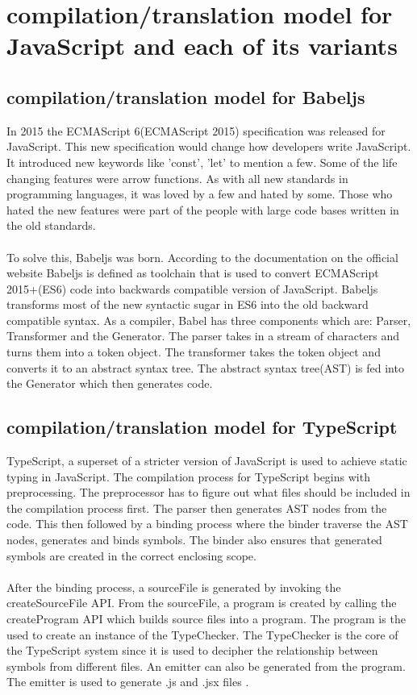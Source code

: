\section{compilation/translation model for JavaScript and each of its variants}

\subsection{compilation/translation model for Babeljs}
In 2015 the ECMAScript 6(ECMAScript 2015) specification was released for JavaScript. This new specification would change how developers write JavaScript. It introduced new keywords like 'const', 'let' to mention a few. Some of the life changing features were arrow functions. As with all new standards in programming languages, it was loved by a few and hated by some. Those who hated the new features were part of the people with large code bases written in the old standards. 
\paragraph{}
To solve this, Babeljs was born. According to the documentation on the official website Babeljs is defined as toolchain that is used to convert ECMAScript 2015+(ES6) code into backwards compatible version of JavaScript\cite{babel}. Babeljs transforms most of the new syntactic sugar in ES6 into the old backward compatible syntax. As a compiler, Babel has three components which are: Parser, Transformer and the Generator. The parser takes in a stream of characters and turns them into a token object. The transformer takes the token object and converts it to an abstract syntax tree. The abstract syntax tree(AST) is fed into the Generator which then generates code\cite{babeltalk}.
\subsection{compilation/translation model for TypeScript}
TypeScript, a superset of a stricter version of JavaScript is used to achieve static typing in JavaScript. The compilation process for TypeScript begins with preprocessing. The preprocessor has to figure out what files should be included in the compilation process first. The parser then generates AST nodes from the code. This then followed by a binding process where the binder traverse the AST nodes, generates and binds symbols. The binder also ensures that generated symbols are created in the correct enclosing scope.
\paragraph{}
After the binding process, a sourceFile is generated by invoking the createSourceFile API. From the sourceFile, a program is created by calling the createProgram API which builds source files into a program. The program is the used to create an instance of the TypeChecker. The TypeChecker is the core of the TypeScript system since it is used to decipher the relationship between symbols from different files. An emitter can also be generated from the program. The  emitter is used to generate .js and .jsx files \cite{typescript}.

